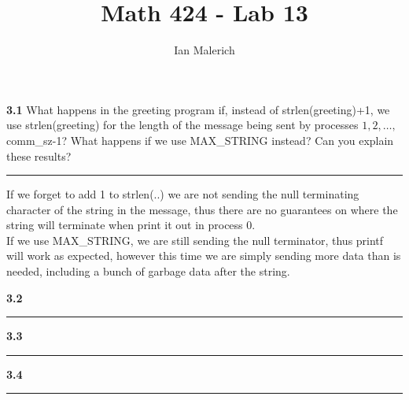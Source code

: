 \documentclass[12pt]{jhwhw}
\author{Ian Malerich}
\title{Math 424 - Lab 13}
\begin{document}
\raggedright


\textbf{3.1}
	What happens in the greeting program if, instead of strlen(greeting)+1,
	we use strlen(greeting) for the length of the message being sent
	by processes $1,2,\ldots,$comm_sz-1? What happens if we use MAX_STRING instead?
	Can you explain these results?
\textcolor[RGB]{240,240,240}{\rule{\textwidth}{0.5pt}}\bigbreak

	\begin{addmargin}[1em]{}
		If we forget to add 1 to strlen(..) we are not sending the null terminating
		character of the string in the message, thus there are no guarantees on
		where the string will terminate when print it out in process 0. \\
		If we use MAX_STRING, we are still sending the null terminator, thus
		printf will work as expected, however this time we are simply sending
		more data than is needed, including a bunch of garbage data after the string. \\
	\end{addmargin}

\textbf{3.2}
\textcolor[RGB]{240,240,240}{\rule{\textwidth}{0.5pt}}\bigbreak

	\begin{addmargin}[1em]{}
	\end{addmargin}

\textbf{3.3}
\textcolor[RGB]{240,240,240}{\rule{\textwidth}{0.5pt}}\bigbreak

	\begin{addmargin}[1em]{}
	\end{addmargin}

\textbf{3.4}
\textcolor[RGB]{240,240,240}{\rule{\textwidth}{0.5pt}}\bigbreak

	\begin{addmargin}[1em]{}
	\end{addmargin}
\end{document}

